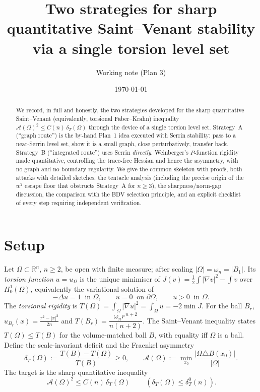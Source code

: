 \documentclass[11pt]{amsart}
\title{Two strategies for sharp quantitative Saint--Venant stability \\ via a single torsion level set}
\author{Working note (Plan 3)}
\date{\today}
\theoremstyle{definition}
\theoremstyle{remark}
\newcommand{\Om}{\Omega}
\newcommand{\dT}{\delta_T}
\newcommand{\Asym}{\mathcal A}
\newcommand{\Rn}{\mathbb R^n}
\begin{document}
\begin{abstract}
We record, in full and honestly, the two strategies developed for the sharp
quantitative Saint--Venant (equivalently, torsional Faber--Krahn) inequality
$\Asym(\Om)^2\le C(n)\,\dT(\Om)$ through the device of a single torsion level
set. Strategy~A (``graph route'') is the by-hand Plan~1 idea executed with
Serrin stability: pass to a near-Serrin level set, show it is a small graph,
close perturbatively, transfer back. Strategy~B (``integrated
route'') uses Serrin \emph{directly}: Weinberger's $P$-function rigidity made
quantitative, controlling the trace-free Hessian and hence the asymmetry, with
no graph and no boundary regularity. We give the common skeleton with proofs,
both attacks with detailed sketches, the tentacle analysis (including the
precise origin of the $w^2$ escape floor that obstructs Strategy~A for
$n\ge3$), the sharpness/norm-gap discussion, the comparison with the BDV
selection principle, and an explicit checklist of every step requiring
independent verification.
\end{abstract}
\maketitle

\section{Setup}

Let $\Om\subset\Rn$, $n\ge2$, be open with finite measure; after scaling
$|\Om|=\omega_n=|B_1|$. Its \emph{torsion function} $u=u_\Om$ is the unique
minimiser of $J(v)=\tfrac12\int|\nabla v|^2-\int v$ over $H^1_0(\Om)$,
equivalently the variational solution of
\begin{equation}\label{eq:torsion}
  -\Delta u=1\ \text{ in }\Om,\qquad u=0\ \text{ on }\partial\Om,\qquad u>0\ \text{ in }\Om.
\end{equation}
The \emph{torsional rigidity} is $T(\Om)=\int_\Om|\nabla u|^2=\int_\Om u=-2\min J$.
For the ball $B_r$, $u_{B_r}(x)=\tfrac{r^2-|x|^2}{2n}$ and
$T(B_r)=\dfrac{\omega_n r^{\,n+2}}{n(n+2)}$. The Saint--Venant inequality
states $T(\Om)\le T(B)$ for the volume-matched ball $B$, with equality iff
$\Om$ is a ball. Define the scale-invariant deficit and the Fraenkel asymmetry
\[
  \dT(\Om):=\frac{T(B)-T(\Om)}{T(B)}\ge0,\qquad
  \Asym(\Om):=\min_{x_0}\frac{|\Om\triangle B(x_0)|}{|\Om|}.
\]
The target is the sharp quantitative inequality
\begin{equation}\label{eq:target}
  \boxed{\ \Asym(\Om)^2\le C(n)\,\dT(\Om)\ }\qquad(\dT(\Om)\le\dT^0(n)).
\end{equation}
\end{document}
